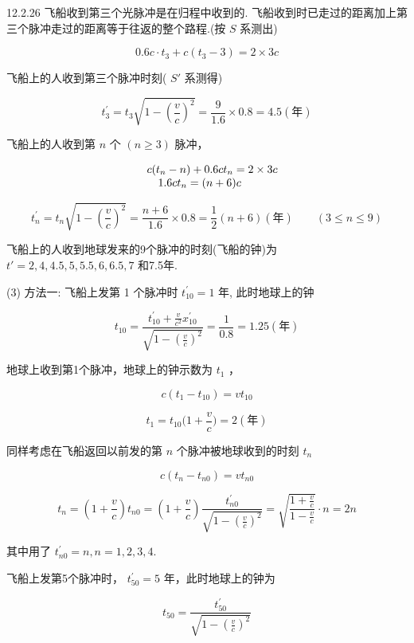 \begin{problem}{12.2.26}
飞船收到第三个光脉冲是在归程中收到的. 飞船收到时已走过的距离加上第三个脉冲走过的距离等于往返的整个路程.(按 $S$ 系测出)

\[
0. 6 c \cdot t _ {3} + c (t _ {3} - 3) = 2 \times 3 c
\]

飞船上的人收到第三个脉冲时刻( $S'$ 系测得)

\[
t _ {3} ^ {\prime} = t _ {3} \sqrt {1 - \left(\frac {v}{c}\right) ^ {2}} = \frac {9}{1 . 6} \times 0. 8 = 4. 5 (\text {年})
\]

飞船上的人收到第 $n$ 个 $(n\geqslant 3)$ 脉冲，

\[
\begin{array}{r l} & c (t _ {n} - n) + 0. 6 c t _ {n} = 2 \times 3 c \\ & \quad 1. 6 c t _ {n} = (n + 6) c \end{array}
\]

\[
t _ {n} ^ {\prime} = t _ {n} \sqrt {1 - \left(\frac {v}{c}\right) ^ {2}} = \frac {n + 6}{1 . 6} \times 0. 8 = \frac {1}{2} (n + 6) (\text {年}) \qquad (3 \leqslant n \leqslant 9)
\]

飞船上的人收到地球发来的9个脉冲的时刻(飞船的钟)为 $t'=2,4,4.5,5,5.5,6,6.5,7$ 和7.5年.

(3) 方法一: 飞船上发第 1 个脉冲时 $t_{10}^{\prime}=1$ 年, 此时地球上的钟

\[
t _ {1 0} = \frac {t _ {1 0} ^ {\prime} + \frac {v}{c ^ {2}} x _ {1 0} ^ {\prime}}{\sqrt {1 - \left(\frac {v}{c}\right) ^ {2}}} = \frac {1}{0 . 8} = 1. 2 5 (\text {年})
\]

地球上收到第1个脉冲，地球上的钟示数为 $t_{1}$ ，

\[
c (t _ {1} - t _ {1 0}) = v t _ {1 0}
\]

\[
t _ {1} = t _ {1 0} \Big (1 + \frac {v}{c} \Big) = 2 (\text {年})
\]

同样考虑在飞船返回以前发的第 $n$ 个脉冲被地球收到的时刻 $t_n$ 

\[
c (t _ {n} - t _ {n 0}) = v t _ {n 0}
\]

\[
t _ {n} = \left(1 + \frac {v}{c}\right) t _ {n 0} = \left(1 + \frac {v}{c}\right) \frac {t _ {n 0} ^ {\prime}}{\sqrt {1 - \left(\frac {v}{c}\right) ^ {2}}} = \sqrt {\frac {1 + \frac {v}{c}}{1 - \frac {v}{c}}} \cdot n = 2 n
\]

其中用了 $t_{n0}^{\prime} = n, n = 1,2,3,4.$ 

飞船上发第5个脉冲时， $t_{50}^{\prime} = 5$ 年，此时地球上的钟为

\[
t _ {5 0} = \frac {t _ {5 0} ^ {\prime}}{\sqrt {1 - \left(\frac {v}{c}\right) ^ {2}}}
\]


\end{problem}
